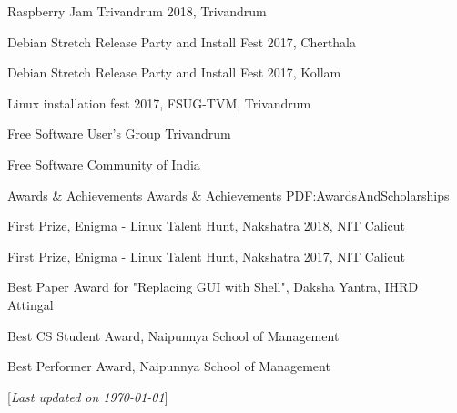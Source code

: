 \documentclass[letterpaper,MMMyyyy,nonstopmode]{simpleresumecv}
\newcommand{\CVNote}{Last updated on {\today}}
\begin{document}
\begin{Body}
\BigGap
\BulletItem
Raspberry Jam Trivandrum 2018, Trivandrum

\BigGap
\BulletItem
Debian Stretch Release Party and Install Fest 2017, Cherthala

\BigGap
\BulletItem
Debian Stretch Release Party and Install Fest 2017, Kollam

\BigGap
\BulletItem
Linux installation fest 2017, FSUG-TVM, Trivandrum

\BigGap
\BulletItem
Free Software User's Group Trivandrum

\BigGap
\BulletItem
Free Software Community of India


\BigGap
\Section
{Awards \&\newline
Achievements}
{Awards \& Achievements}
{PDF:AwardsAndScholarships}

\BulletItem
First Prize, Enigma - Linux Talent Hunt,
Nakshatra 2018, NIT Calicut
\hfill
{}

\BigGap
\BulletItem
First Prize, Enigma - Linux Talent Hunt,
Nakshatra 2017, NIT Calicut
\hfill
{}

\BigGap
\BulletItem
Best Paper Award for "Replacing GUI with Shell",
Daksha Yantra, IHRD Attingal
\hfill
{}

\BigGap
\BulletItem
Best CS Student Award,
Naipunnya School of Management
\hfill
{}

\BigGap
\BulletItem
Best Performer Award,
Naipunnya School of Management
\hfill
{}


\end{Body}


\BigGap
\UseNoteFont%
\null\hfill%
[\textit{\CVNote}]
\end{document}
